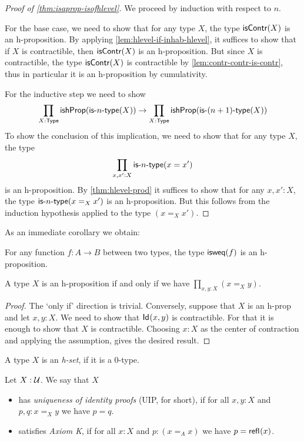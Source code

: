 \begin{proof}[Proof of \autoref{thm:isaprop-isofhlevel}]
  We proceed by induction with respect to $n$.

 For the base case, we need to show that for any type $X$, the type $\mathsf{isContr}(X)$ is an
        h-proposition. By applying \autoref{lem:hlevel-if-inhab-hlevel}, it suffices to show that
        if $X$ is contractible, then $\mathsf{isContr}(X)$ is an h-proposition.
        But since $X$ is contractible, the type $\mathsf{isContr}(X)$ is contractible by \autoref{lem:contr-contr-is-contr},
          thus in particular it is an h-proposition by cumulativity.

For the inductive step we need to show
\[\prod_{X : \mathsf{Type}} \mathsf{ishProp} (\mathsf{is}\mbox{-}{n}\mbox{-}\mathsf{type}(X)) \to \prod_{X : \mathsf{Type}} \mathsf{ishProp} (\mathsf{is}\mbox{-}{(n+1)}\mbox{-}\mathsf{type}(X)) \]
To show the conclusion of this implication, we need to show that for any type $X$, the type
    \[\prod_{x, x' : X}\mathsf{is}\mbox{-}{n}\mbox{-}\mathsf{type}(x = x')\]
is an h-proposition. By \autoref{thm:hlevel-prod} it suffices to show that for any $x, x' : X$, the type $\mathsf{is}\mbox{-}{n}\mbox{-}\mathsf{type}(x =_X x')$ is an h-proposition.
But this follows from the induction hypothesis applied to the type $(x =_X x')$.
\end{proof}

As an immediate corollary we obtain:

\begin{cor}
 For any function $f \colon A \to B$ between two types, the type $\mathsf{isweq}(f)$ is an h-proposition.
\end{cor}

\begin{thm}
 A type $X$ is an h-proposition if and only if we have $\prod\limits_{x, y : X} (x =_X y)$.
\end{thm}

\begin{proof}
 The `only if' direction is trivial. Conversely, suppose that $X$ is an h-prop and let $x, y : X$. We need to show that $\mathsf{Id}_{}(x,y)$ is contractible. For that it is enough to show that $X$ is contractible. Choosing $x : X$ as the center of contraction and applying the assumption, gives the desired result.
\end{proof}

\begin{defn}\label{defn:h-set}
 A type $X$ is an {\em h-set}, if it is a $0$-type.
\end{defn}

\begin{defn}
 Let $X : \mathcal{U}$. We say that $X$
 \begin{itemize}
  \item has {\em uniqueness of identity proofs} (UIP, for short), if for all $x, y : X$ and $p, q : x =_X y$ we have $p = q$.
  \item satisfies {\em Axiom K}, if for all $x : X$ and $p : (x =_A x)$ we have $p = \mathsf{refl}_{}(x)$.
 \end{itemize}
\end{defn}

